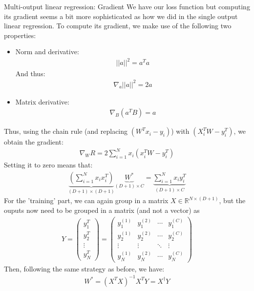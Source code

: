 \begin{parag}{Multi-output linear regression: Gradient}
    We have our loss function but computing its gradient seems a bit more sophisticated as how we did in the single output linear regression. To compute its gradient, we make use of the following two properties:
	\begin{itemize}
		\item Norm and derivative:
			\begin{align*} ||a||^2 =  a^{T}a \end{align*}
			And thus:
			\begin{align*} \nabla_a ||a||^2 = 2a \end{align*}
		\item Matrix derivative:
			\begin{align*} 
				\nabla_B\left(a^{T}B\right) = a
			\end{align*}
	\end{itemize}
	Thus, using the chain rule (and replacing $\left(W^{T}x_i - y_i\right)$) with $\left(X_i^{T}W - y_i^{T}\right)$, we obtain the gradient:
	\begin{align*} 
		\nabla_W R = 2 \sum_{i= 1}^{N}x_i\left(x_i^{T}W - y_i^{T}\right)
	\end{align*}
	Setting it to zero means that:
	\begin{align*} 
		\underbrace{\left(\sum_{i= 1}^{N}x_ix_i^{T}\right)}_{\left(D+1\right) \times \left(D + 1\right)}\underbrace{W^{\ast}}_{\left(D + 1\right) \times C} = \underbrace{\sum_{i= 1}^{N}x_iy_i^{T}}_{\left(D + 1\right) \times C}
	\end{align*}
	For the 'training' part, we can again group in a matrix $X \in \mathbb{R}^{ N \times \left( D + 1\right)}$, but the ouputs now need to be grouped in a matrix (and not a vector) as 
	\begin{align*} 
		Y = \begin{pmatrix} y_1^{T} \\ y_2^{T} \\ \vdots \\ y_N^{T} \end{pmatrix}  = \begin{pmatrix} y_1^{\left(1\right)} & y_1^{\left(2\right)} & \cdots & y_1^{\left(C\right)} \\ y_2^{\left(1\right)} & y_2^{\left(2\right)} & \cdots & y_2^{\left(C\right)} \\ \vdots & \vdots & \ddots & \vdots \\ y_N^{\left(1\right)} & y_N^{\left(2\right)} & \cdots & y_N^{\left(C\right)} \end{pmatrix} 
	\end{align*}
	Then, following the same strategy as before, we have:
	\begin{align*} 
		W^{\ast} = \left(X^{T}X\right)^{-1}X^{T}Y =  X^{\dagger}Y
	\end{align*}
\end{parag}


